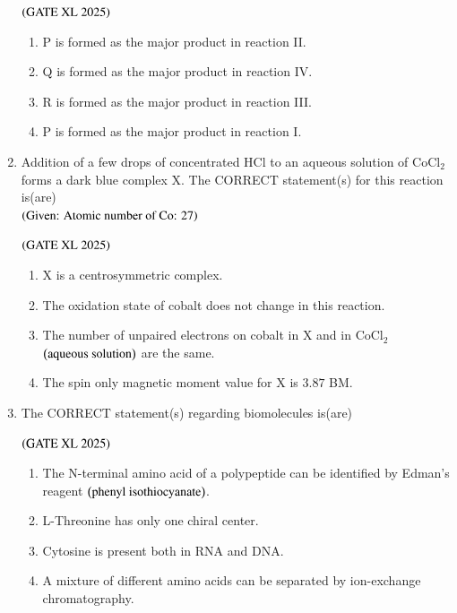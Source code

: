 \documentclass[journal]{IEEEtran}
\begin{document}
\begin{enumerate}
    \hfill $\left(\text{GATE XL 2025}\right)$

    \begin{enumerate}
        \item P is formed as the major product in reaction II.
        \item Q is formed as the major product in reaction IV.
        \item R is formed as the major product in reaction III.
        \item P is formed as the major product in reaction I.
    \end{enumerate}

    \item Addition of a few drops of concentrated HCl to an aqueous solution of CoCl$_2$ forms a dark blue complex X. The CORRECT statement(s) for this reaction is(are)\\
    $\left(\text{Given: Atomic number of Co: 27}\right)$

    \hfill $\left(\text{GATE XL 2025}\right)$

    \begin{enumerate}
        \item X is a centrosymmetric complex.
        \item The oxidation state of cobalt does not change in this reaction.
        \item The number of unpaired electrons on cobalt in X and in CoCl$_2$ $\left(\text{aqueous solution}\right)$ are the same.
        \item The spin only magnetic moment value for X is $3.87$ BM.
    \end{enumerate}

    \item The CORRECT statement(s) regarding biomolecules is(are)

    \hfill $\left(\text{GATE XL 2025}\right)$

    \begin{enumerate}
        \item The N-terminal amino acid of a polypeptide can be identified by Edman's reagent $\left(\text{phenyl isothiocyanate}\right)$.
        \item L-Threonine has only one chiral center.
        \item Cytosine is present both in RNA and DNA.
        \item A mixture of different amino acids can be separated by ion-exchange chromatography.
    \end{enumerate}


\end{enumerate}
\end{document}
